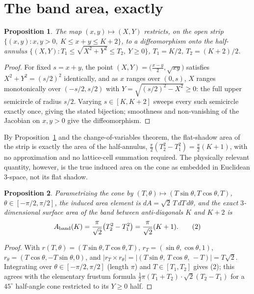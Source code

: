 \documentclass[11pt]{amsart}
\newtheorem{proposition}{Proposition}
\theoremstyle{remark}
\begin{document}
\section{The band area, exactly}

\begin{proposition}\label{prop:diffeo}
The map $(x,y)\mapsto(X,Y)$ restricts, on the open strip
$\{(x,y): x,y>0,\ K\le x+y\le K+2\}$, to a diffeomorphism onto the half-annulus
$\{(X,Y): T_1\le\sqrt{X^2+Y^2}\le T_2,\ Y\ge0\}$, $T_1=K/2$, $T_2=(K+2)/2$.
\end{proposition}
\begin{proof}
For fixed $s=x+y$, the point $(X,Y)=\big(\tfrac{x-y}2,\sqrt{xy}\big)$ satisfies
$X^2+Y^2=(s/2)^2$ identically, and as $x$ ranges over $(0,s)$, $X$ ranges monotonically
over $(-s/2,s/2)$ with $Y=\sqrt{(s/2)^2-X^2}\ge0$: the full upper semicircle of radius
$s/2$. Varying $s\in[K,K+2]$ sweeps every such semicircle exactly once, giving the
stated bijection; smoothness and non-vanishing of the Jacobian on $x,y>0$ give the
diffeomorphism.
\end{proof}

By Proposition~\ref{prop:diffeo} and the change-of-variables theorem, the flat-shadow
area of the strip is exactly the area of the half-annulus,
$\tfrac\pi2(T_2^2-T_1^2)=\tfrac\pi2(K+1)$, with no approximation and no lattice-cell
summation required. The physically relevant quantity, however, is the true induced
area on the cone as embedded in Euclidean $3$-space, not its flat shadow.

\begin{proposition}\label{prop:3darea}
Parametrizing the cone by $(T,\theta)\mapsto(T\sin\theta,T\cos\theta,T)$,
$\theta\in[-\pi/2,\pi/2]$, the induced area element is $dA=\sqrt2\,T\,dT\,d\theta$, and
the exact $3$-dimensional surface area of the band between anti-diagonals $K$ and $K+2$ is
\begin{equation}
A_{\rm band}(K) = \frac{\pi}{\sqrt2}\big(T_2^2-T_1^2\big) = \frac{\pi}{\sqrt2}(K+1). \tag{2}
\end{equation}
\end{proposition}
\begin{proof}
With $r(T,\theta)=(T\sin\theta,T\cos\theta,T)$, $r_T=(\sin\theta,\cos\theta,1)$,
$r_\theta=(T\cos\theta,-T\sin\theta,0)$, and $|r_T\times r_\theta|
=|(T\sin\theta,\,T\cos\theta,\,-T)|=T\sqrt2$. Integrating over
$\theta\in[-\pi/2,\pi/2]$ (length $\pi$) and $T\in[T_1,T_2]$ gives (2); this agrees with
the elementary frustum formula $\tfrac12\pi(T_1+T_2)\cdot\sqrt2(T_2-T_1)$ for a $45^\circ$
half-angle cone restricted to its $Y\ge0$ half.
\end{proof}
\end{document}
